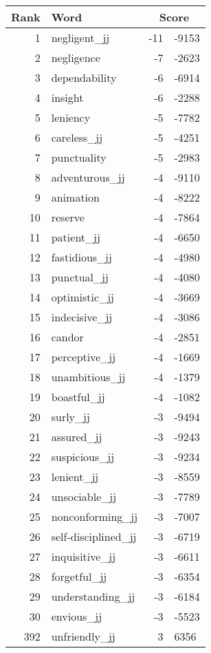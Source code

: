 \begin{longtable}[!htbp]{| rlr@{.}l |}
    \hline
    \textbf{Rank} & \textbf{Word} & \multicolumn{2}{c|}{\textbf{Score}} \\
    \hline
    \endhead
    1 & negligent\_jj & -11 & -9153 \\
    2 & negligence & -7 & -2623 \\
    3 & dependability & -6 & -6914 \\
    4 & insight & -6 & -2288 \\
    5 & leniency & -5 & -7782 \\
    6 & careless\_jj & -5 & -4251 \\
    7 & punctuality & -5 & -2983 \\
    8 & adventurous\_jj & -4 & -9110 \\
    9 & animation & -4 & -8222 \\
    10 & reserve & -4 & -7864 \\
    11 & patient\_jj & -4 & -6650 \\
    12 & fastidious\_jj & -4 & -4980 \\
    13 & punctual\_jj & -4 & -4080 \\
    14 & optimistic\_jj & -4 & -3669 \\
    15 & indecisive\_jj & -4 & -3086 \\
    16 & candor & -4 & -2851 \\
    17 & perceptive\_jj & -4 & -1669 \\
    18 & unambitious\_jj & -4 & -1379 \\
    19 & boastful\_jj & -4 & -1082 \\
    20 & surly\_jj & -3 & -9494 \\
    21 & assured\_jj & -3 & -9243 \\
    22 & suspicious\_jj & -3 & -9234 \\
    23 & lenient\_jj & -3 & -8559 \\
    24 & unsociable\_jj & -3 & -7789 \\
    25 & nonconforming\_jj & -3 & -7007 \\
    26 & self-disciplined\_jj & -3 & -6719 \\
    27 & inquisitive\_jj & -3 & -6611 \\
    28 & forgetful\_jj & -3 & -6354 \\
    29 & understanding\_jj & -3 & -6184 \\
    30 & envious\_jj & -3 & -5523 \\
    392 & unfriendly\_jj & 3 & 6356 \\

\end{longtable}
